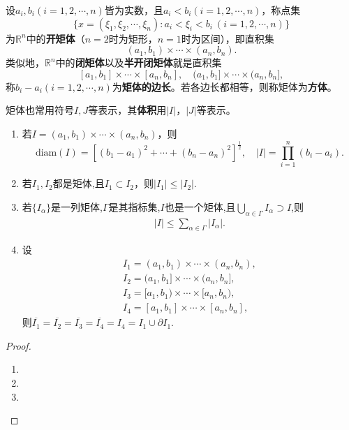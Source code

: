 \documentclass[../../main.tex]{subfiles}
\begin{document}
\begin{definition}[矩体]
设\(a_i,b_i(i = 1,2,\cdots,n)\)皆为实数，且\(a_i < b_i(i = 1,2,\cdots,n)\)，称点集
\[\{x = (\xi_1,\xi_2,\cdots,\xi_n):a_i<\xi_i < b_i\ (i = 1,2,\cdots,n)\}\]
为\(\mathbb{R}^n\)中的\textbf{开矩体}（\(n = 2\)时为矩形，\(n = 1\)时为区间），即直积集
\[(a_1,b_1)\times\cdots\times(a_n,b_n).\]
类似地，\(\mathbb{R}^n\)中的\textbf{闭矩体}以及\textbf{半开闭矩体}就是直积集
\[[a_1,b_1]\times\cdots\times[a_n,b_n],\quad(a_1,b_1]\times\cdots\times(a_n,b_n],\]
称\(b_i - a_i(i = 1,2,\cdots,n)\)为\textbf{矩体的边长}。若各边长都相等，则称矩体为\textbf{方体}。

矩体也常用符号\(I,J\)等表示，其\textbf{体积}用\(|I|\)，\(|J|\)等表示。
\end{definition}

\begin{proposition}[矩体的性质]\label{proposition:矩体的性质}
\begin{enumerate}[(1)]
\item 若\(I=(a_1,b_1)\times\cdots\times(a_n,b_n)\)，则
\[\text{diam}(I)=[(b_1 - a_1)^2+\cdots+(b_n - a_n)^2]^{\frac{1}{2}},\quad |I|=\prod_{i = 1}^{n}(b_i - a_i).\]

\item 若\(I_1,I_2\)都是矩体,且$I_1\subset I_2$，则$|I_1|\leqslant |I_2|$.

\item 若$\{I_\alpha\}$是一列矩体,$\Gamma$是其指标集,$I$也是一个矩体,且$\bigcup_{\alpha\in \Gamma}I_\alpha \supset I$,则
\begin{align*}
|I|\leqslant \sum_{\alpha\in \Gamma}|I_\alpha|.
\end{align*}

\item 设
\begin{gather*}
I_1=(a_1,b_1)\times \cdots \times (a_n,b_n),
\\
I_2=(a_1,b_1]\times \cdots \times (a_n,b_n],
\\
I_3=[a_1,b_1)\times \cdots \times [a_n,b_n),
\\
I_4=[a_1,b_1]\times \cdots \times [a_n,b_n],
\end{gather*}
则$\overline{I_1}=\overline{I_2}=\overline{I_3}=\overline{I_4}=I_4=I_1\cup \partial I_1$.
\end{enumerate}
\end{proposition}
\begin{proof}
\begin{enumerate}[(1)]
\item 

\item 

\item 
\end{enumerate}
\end{proof}
\end{document}
